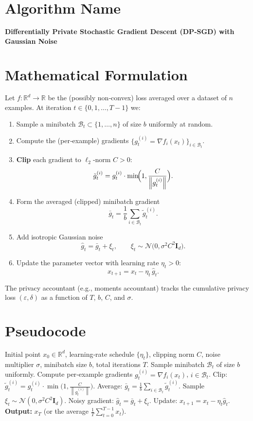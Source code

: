 \documentclass{article}
\newcommand{\RR}{\mathbb{R}}
\newcommand{\norm}[1]{\left\|#1\right\|}
\newcommand{\grad}{\nabla}
\begin{document}
\section*{Algorithm Name}
\textbf{Differentially Private Stochastic Gradient Descent (DP‑SGD) with Gaussian Noise}

\section*{Mathematical Formulation}
Let $f:\RR^{d}\to\RR$ be the (possibly non‑convex) loss averaged over a dataset of $n$ examples.
At iteration $t\in\{0,1,\dots,T-1\}$ we:
\begin{enumerate}[label=\arabic*)]
\item Sample a minibatch $\mathcal{B}_{t}\subset\{1,\dots,n\}$ of size $b$ uniformly at random.
\item Compute the (per‑example) gradients $\{g_{t}^{(i)}=\grad f_{i}(x_{t})\}_{i\in\mathcal{B}_{t}}$.
\item \textbf{Clip} each gradient to $\ell_{2}$‑norm $C>0$:
\[
\tilde g_{t}^{(i)} = g_{t}^{(i)}\cdot \min\!\Bigl(1,\frac{C}{\norm{g_{t}^{(i)}}}\Bigr).
\]
\item Form the averaged (clipped) minibatch gradient
\[
\bar g_{t}= \frac{1}{b}\sum_{i\in\mathcal{B}_{t}} \tilde g_{t}^{(i)} .
\]
\item Add isotropic Gaussian noise
\[
\hat g_{t}= \bar g_{t}+ \xi_{t},\qquad 
\xi_{t}\sim \mathcal{N}\bigl(0,\sigma^{2}C^{2}\mathbf{I}_{d}\bigr).
\]
\item Update the parameter vector with learning rate $\eta_{t}>0$:
\[
x_{t+1}=x_{t}-\eta_{t}\,\hat g_{t}.
\]
\end{enumerate}
The privacy accountant (e.g., moments accountant) tracks the cumulative privacy loss $(\varepsilon,\delta)$ as a function of $T$, $b$, $C$, and $\sigma$.

\section*{Pseudocode}
\begin{algorithm}[H]
\caption{DP‑SGD with Gaussian Noise}
\begin{algorithmic}[1]
\Require Initial point $x_{0}\in\RR^{d}$, learning‑rate schedule $\{\eta_{t}\}$, clipping norm $C$, noise multiplier $\sigma$, minibatch size $b$, total iterations $T$.
    \State Sample minibatch $\mathcal{B}_{t}$ of size $b$ uniformly.
    \State Compute per‑example gradients $g_{t}^{(i)}=\grad f_{i}(x_{t})$, $i\in\mathcal{B}_{t}$.
    \State Clip: $\tilde g_{t}^{(i)}=g_{t}^{(i)}\cdot\min\bigl(1,\frac{C}{\norm{g_{t}^{(i)}}}\bigr)$.
    \State Average: $\bar g_{t}= \frac{1}{b}\sum_{i\in\mathcal{B}_{t}}\tilde g_{t}^{(i)}$.
    \State Sample $\xi_{t}\sim\mathcal{N}(0,\sigma^{2}C^{2}\mathbf{I}_{d})$.
    \State Noisy gradient: $\hat g_{t}= \bar g_{t}+ \xi_{t}$.
    \State Update: $x_{t+1}= x_{t}-\eta_{t}\hat g_{t}$.
\EndFor
\State \textbf{Output:} $x_{T}$ (or the average $\frac{1}{T}\sum_{t=0}^{T-1}x_{t}$).
\end{algorithmic}
\end{algorithm}
\end{document}
